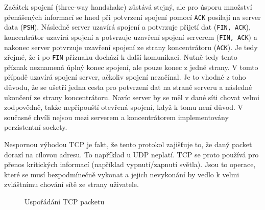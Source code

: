Začátek spojení (three-way handshake) zůstává stejný, ale pro úsporu množství přenášených informací se hned při potvrzení spojení pomocí \texttt{ACK} posílají na server data (\texttt{PSH}). Následně server uzavírá spojení a potvrzuje přijetí dat (\texttt{FIN, ACK}), koncentrátor uzavírá spojení a potvrzuje uzavření spojení serverem (\texttt{FIN, ACK}) a nakonec server potvrzuje uzavření spojení ze strany koncentrátoru (\texttt{ACK}). Je tedy zřejmé, že i po \texttt{FIN} příznaku dochází k další komunikaci. Nutně tedy tento příznak neznamená úplný konec spojení, ale pouze konec z jedné strany. V tomto případě uzavírá spojení server, ačkoliv spojení nezačínal. Je to vhodné z toho důvodu, že se ušetří jedna cesta pro potvrzení dat na straně serveru a následné ukončení ze strany koncentrátoru. Navíc server by se měl v dané síti chovat velmi zodpovědně, takže nepřipouští otevřená spojení, když k tomu není důvod. V současné chvíli nejsou mezi serverem a koncentrátorem implementovány perzistentní sockety.

Nespornou výhodou TCP je fakt, že tento protokol zajišťuje to, že daný packet dorazí na cílovou adresu. To například u UDP neplatí. TCP se proto používá pro přenos kritických informací (například vypnutí/zapnutí světla). Jsou to operace, které se musí bezpodmínečně vykonat a jejich nevykonání by vedlo k velmi zvláštnímu chování sítě ze strany uživatele.

\begin{figure}[H]
    \centering
	\caption{Uspořádání TCP packetu}
	\label{fig:tcp-packet}
\end{figure}


